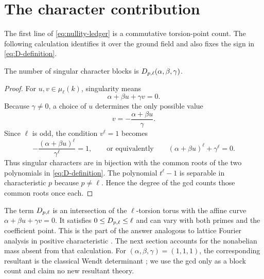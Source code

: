 \section{The character contribution}

The first line of \eqref{eq:nullity-ledger} is a commutative torsion-point
count.  The following calculation identifies it over the ground field and
also fixes the sign in \eqref{eq:D-definition}.

\begin{proposition}\label{prop:character-count}
The number of singular character blocks is
$D_{p,\ell}(\alpha,\beta,\gamma)$.
\end{proposition}

\begin{proof}
For $u,v\in\mu_\ell(k)$, singularity means
\begin{equation}\label{eq:character-equation}
 \alpha+\beta u+\gamma v=0.
\end{equation}
Because $\gamma\ne0$, a choice of $u$ determines the only possible value
\[
 v=-\frac{\alpha+\beta u}{\gamma}.
\]
Since $\ell$ is odd, the condition $v^\ell=1$ becomes
\[
 -\frac{(\alpha+\beta u)^\ell}{\gamma^\ell}=1,
 \qquad\text{or equivalently}\qquad
 (\alpha+\beta u)^\ell+\gamma^\ell=0.
\]
Thus singular characters are in bijection with the common roots of the two
polynomials in \eqref{eq:D-definition}.  The polynomial $t^\ell-1$ is
separable in characteristic $p$ because $p\ne\ell$.  Hence the degree of the
gcd counts those common roots once each.
\end{proof}

\begin{remark}\label{rem:arithmetic-content}
The term $D_{p,\ell}$ is an intersection of the $\ell$-torsion torus with the
affine curve $\alpha+\beta u+\gamma v=0$.  It satisfies
$0\le D_{p,\ell}\le\ell$ and can vary with both primes and the coefficient point.
This is the part of the answer analogous to lattice Fourier analysis in
positive characteristic \citep{Zaidenberg2008}.  The next section accounts
for the nonabelian mass absent from that calculation.
For $(\alpha,\beta,\gamma)=(1,1,1)$, the corresponding resultant is the
classical Wendt determinant \citep{FordJha1993}; we use the gcd only as a
block count and claim no new resultant theory.
\end{remark}
